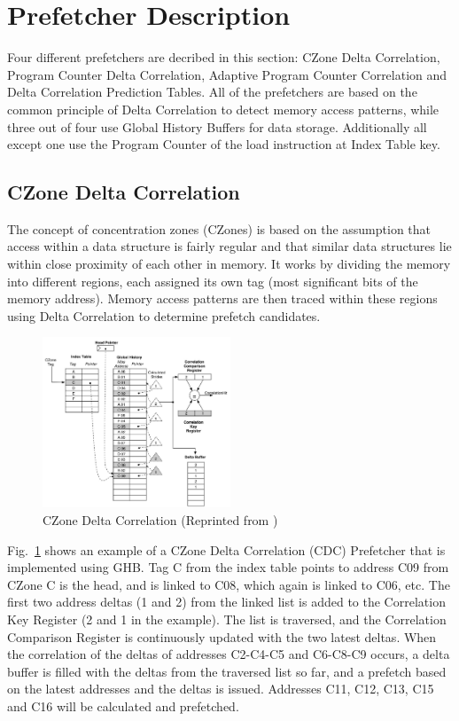 \documentclass[a4paper]{IEEEtran}
\begin{document}
\section{Prefetcher Description}

Four different prefetchers are decribed in this section: CZone Delta Correlation, Program Counter Delta Correlation, Adaptive Program Counter Correlation and Delta Correlation Prediction Tables. 
All of the prefetchers are based on the common principle of Delta Correlation to detect memory access patterns, while three out of four use Global History Buffers for data storage.
Additionally all except one use the Program Counter of the load instruction at Index Table key.

\subsection{CZone Delta Correlation}

The concept of concentration zones (CZones) is based on the assumption that access within a data structure is fairly regular and that similar data structures lie within close proximity of each other in memory.
It works by dividing the memory into different regions, each assigned its own tag (most significant bits of the memory address).
Memory access patterns are then traced within these regions using Delta Correlation to determine prefetch candidates.

\begin{figure}[!ht]
  \centering
      \includegraphics[width=0.5\textwidth]{Figures/CDC}
  \caption{CZone Delta Correlation (Reprinted from \protect\cite{acdc})}
  \label{fig:CDC}
\end{figure}

Fig.~\ref{fig:CDC} shows an example of a CZone Delta Correlation (CDC) Prefetcher that is implemented using GHB. 
Tag C from the index table points to address C09 from CZone C is the head, and is linked to C08,  which again is linked to C06, etc. 
The first two address deltas (1 and 2) from the linked list is added to the Correlation Key Register (2 and 1 in the example). 
The list is traversed, and the Correlation Comparison Register is continuously updated with the two latest deltas. 
When the correlation of the deltas of addresses C2-C4-C5 and C6-C8-C9  occurs, a delta buffer is filled with the deltas from the traversed list so far, and a prefetch based on the latest addresses and the deltas is issued.
Addresses C11, C12, C13, C15 and C16 will be calculated and prefetched.
\end{document}
